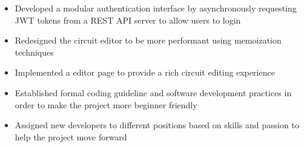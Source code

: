 
\begin{itemize}
  \item Developed a modular authentication interface by asynchronously requesting
  JWT tokens from a REST API server to allow users to login
  \item Redesigned the circuit editor to be more performant using memoization
  techniques
  \item Implemented a editor page to provide a rich circuit editing experience
  \item Established formal coding guideline and software development
  practices in order to make the project more beginner friendly
  \item Assigned new developers to different positions based on skills and
  passion to help the project move forward
\end{itemize}
